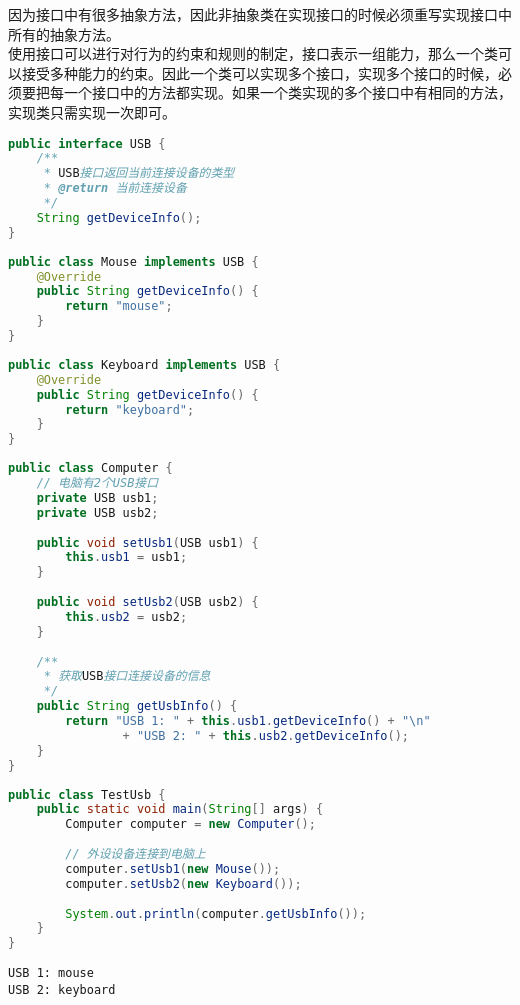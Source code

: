 因为接口中有很多抽象方法，因此非抽象类在实现接口的时候必须重写实现接口中所有的抽象方法。\\

使用接口可以进行对行为的约束和规则的制定，接口表示一组能力，那么一个类可以接受多种能力的约束。因此一个类可以实现多个接口，实现多个接口的时候，必须要把每一个接口中的方法都实现。如果一个类实现的多个接口中有相同的方法，实现类只需实现一次即可。\\


\begin{lstlisting}[language=Java, title=USB.java]
public interface USB {
    /**
     * USB接口返回当前连接设备的类型
     * @return 当前连接设备
     */
    String getDeviceInfo();
}
\end{lstlisting}

\begin{lstlisting}[language=Java, title=Mouse.java]
public class Mouse implements USB {
    @Override
    public String getDeviceInfo() {
        return "mouse";
    }
}
\end{lstlisting}

\begin{lstlisting}[language=Java, title=Keyboard.java]
public class Keyboard implements USB {
    @Override
    public String getDeviceInfo() {
        return "keyboard";
    }
}
\end{lstlisting}

\begin{lstlisting}[language=Java, title=Computer.java]
public class Computer {
    // 电脑有2个USB接口
    private USB usb1;
    private USB usb2;
    
    public void setUsb1(USB usb1) {
        this.usb1 = usb1;
    }
    
    public void setUsb2(USB usb2) {
        this.usb2 = usb2;
    }
    
    /**
     * 获取USB接口连接设备的信息
     */
    public String getUsbInfo() {
        return "USB 1: " + this.usb1.getDeviceInfo() + "\n"
                + "USB 2: " + this.usb2.getDeviceInfo();
    }
}
\end{lstlisting}

\begin{lstlisting}[language=Java, title=TestUsb.java]
public class TestUsb {
    public static void main(String[] args) {
        Computer computer = new Computer();
        
        // 外设设备连接到电脑上
        computer.setUsb1(new Mouse());
        computer.setUsb2(new Keyboard());
        
        System.out.println(computer.getUsbInfo());
    }
}
\end{lstlisting}

\begin{tcolorbox}
	\begin{verbatim}
USB 1: mouse
USB 2: keyboard
	\end{verbatim}
\end{tcolorbox}

\newpage